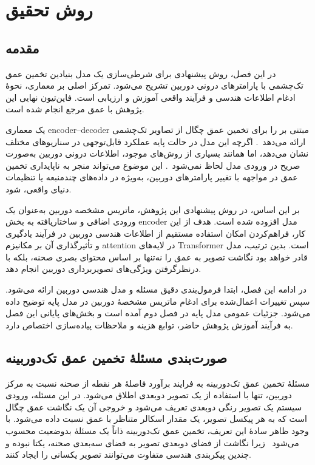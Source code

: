 \chapter{روش تحقیق}
\section{مقدمه} 

در این فصل، روش پیشنهادی برای شرطی‌سازی یک مدل بنیادین تخمین عمق تک‌چشمی با پارامترهای درونی دوربین تشریح می‌شود. تمرکز اصلی بر معماری، نحوهٔ ادغام اطلاعات هندسی و فرآیند واقعی آموزش و ارزیابی است. فاین‌تیون نهایی این پژوهش با عمق مرجع انجام شده است.

\basemodel{} یک معماری encoder--decoder مبتنی بر  را برای تخمین عمق چگال از تصاویر تک‌چشمی ارائه می‌دهد~\cite{DepthAnythingV2}. اگرچه این مدل در حالت پایه عملکرد قابل‌توجهی در سناریوهای مختلف نشان می‌دهد، اما همانند بسیاری از روش‌های موجود، اطلاعات درونی دوربین به‌صورت صریح در ورودی مدل لحاظ نمی‌شود~\cite{Eigen2014Depth,Godard2017Unsupervised,Ranftl2021DPT}. این موضوع می‌تواند منجر به ناپایداری تخمین عمق در مواجهه با تغییر پارامترهای دوربین، به‌ویژه در داده‌های چندمنبعه یا تنظیمات دنیای واقعی، شود.

بر این اساس، در روش پیشنهادی این پژوهش، ماتریس مشخصه دوربین به‌عنوان یک ورودی اضافی و ساختاریافته به بخش encoder مدل افزوده شده است. هدف از این کار، فراهم‌کردن امکان استفاده مستقیم از اطلاعات هندسی دوربین در فرآیند یادگیری و تأثیرگذاری آن بر مکانیزم attention در لایه‌های Transformer است. بدین ترتیب، مدل قادر خواهد بود نگاشت تصویر به عمق را نه‌تنها بر اساس محتوای بصری صحنه، بلکه با درنظرگرفتن ویژگی‌های تصویربرداری دوربین انجام دهد.

در ادامه این فصل، ابتدا فرمول‌بندی دقیق مسئله و مدل هندسی دوربین ارائه می‌شود. سپس تغییرات اعمال‌شده برای ادغام ماتریس مشخصهٔ دوربین در مدل پایه توضیح داده می‌شود. جزئیات عمومی مدل پایه در فصل دوم آمده است و بخش‌های پایانی این فصل به فرآیند آموزش پژوهش حاضر، توابع هزینه و ملاحظات پیاده‌سازی اختصاص دارد.

\section{صورت‌بندی مسئلهٔ تخمین عمق تک‌دوربینه}

مسئلهٔ تخمین عمق تک‌دوربینه به فرایند برآورد فاصلهٔ هر نقطه از صحنه نسبت به مرکز دوربین، تنها با استفاده از یک تصویر دوبعدی اطلاق می‌شود. در این مسئله، ورودی سیستم یک تصویر رنگی دوبعدی تعریف می‌شود و خروجی آن یک نگاشت عمق چگال است که به هر پیکسل تصویر، یک مقدار اسکالر متناظر با عمق نسبت داده می‌شود. با وجود ظاهر سادهٔ این تعریف، تخمین عمق تک‌دوربینه ذاتاً یک مسئلهٔ بدوضعیت محسوب می‌شود~\cite{HartleyZisserman2004,Saxena2009Make3D} زیرا نگاشت از فضای دوبعدی تصویر به فضای سه‌بعدی صحنه، یکتا نبوده و چندین پیکربندی هندسی متفاوت می‌توانند تصویر یکسانی را ایجاد کنند.

